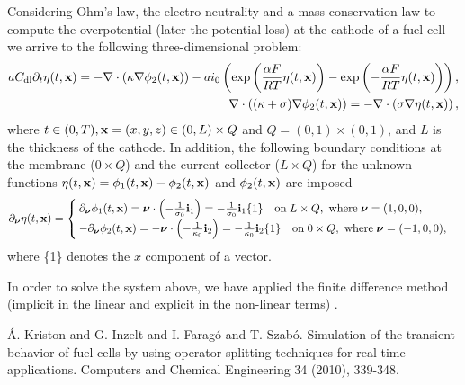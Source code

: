 Considering Ohm's law, the electro-neutrality and a mass conservation law to compute the overpotential (later the potential loss) at the cathode of a fuel cell we arrive to the following three-dimensional problem:
\begin{align}
aC_{\textrm{dl}} \partial_t \eta(t,{\bf x}) = -\nabla\cdot \left( \kappa\nabla\phi_2 (t,{\bf x})\right)-ai_0\left(\exp\left( \frac{ \alpha F}{R T} \eta (t,{\bf x})\right) -\exp\left(-\frac{ \alpha F}{R T} \eta (t,{\bf x}) \right)\right), \\
\nabla \cdot \left((\kappa+\sigma)\nabla\phi_2 (t,{\bf x})\right)=-\nabla\cdot\left(\sigma\nabla\eta (t,{\bf x})\right),
\end{align}
where  $t\in(0,T), {\bf x} = (x,y,z)\in (0,L)\times Q$ and $Q=(0,1)\times(0,1)$, and $L$ is the thickness of the cathode. 
In addition, the following boundary conditions at the membrane ($0\times Q$) and the current collector ($L\times Q$) for the unknown functions $\eta(t,{\bf x})=\phi_1(t,{\bf x})-\phi_2(t,{\bf x})$ and $\phi_2(t,{\bf x})$ are imposed
\begin{equation}
\label{bc_cases}
\partial_\nnu \eta(t,{\bf x}) = 
\begin{cases}
  \partial_\nnu \phi_{1}(t,{\bf x}) = \nnu\cdot \left( -\frac{1}{\sigma_0} \ii_1 \right) = 
  -\frac{1}{\sigma_0} \ii_1\{1\}\quad \textrm{on}\; L\times Q, \ \textrm{where}\; 
\nnu = (1,0,0),\\
- \partial_\nnu \phi_{2}(t,{\bf x}) = - \nnu\cdot \left( -\frac{1}{\kappa_0} \ii_2 \right) = 
  -\frac{1}{\kappa_0} \ii_2\{1\}\quad \textrm{on}\;0\times Q, \ \textrm{where}\; 
\nnu = (-1,0,0),
\end{cases}
\end{equation}
where \{1\} denotes the $x$ component of a vector.

In order to solve the system above, we have applied the finite difference method (implicit in the linear and explicit in the non-linear terms)  \cite{kriston}.


\begin{thebibliography}{10}

{\sc \'A. Kriston and G. Inzelt and I. Farag\'o and T. Szab\'o}. {Simulation of the transient  behavior of fuel cells by using operator splitting techniques for real-time applications}. Computers and Chemical Engineering 34 (2010), 339-348.

\end{thebibliography}
